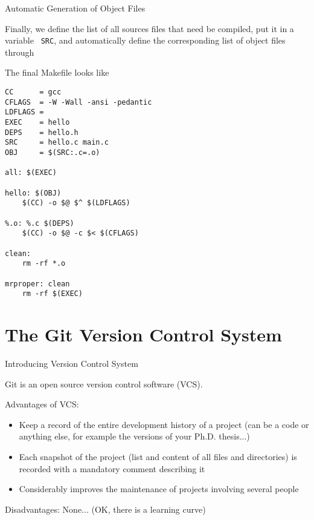 \documentclass[mode=present,paper=screen,size=12pt,style=paintings]{powerdot}
\newcommand{\boite}[1]{\fbox{\parbox{\textwidth}{{\tt\color{blue} #1}}}}
\newcommand{\cc}[1]{{\tt\color{blue} #1}}
\begin{document}
\begin{slide}{Automatic Generation of Object Files}

Finally, we define the list of all sources files that need be compiled, put it in a variable \cc{SRC}, and automatically define the corresponding list of object files through

\boite{OBJ= \$(SRC:.c=.o)}\medskip

The final Makefile looks like

\lstset{
    language=C,
    basicstyle=\tiny,
    frame=single
}
\begin{lstlisting}
CC      = gcc
CFLAGS  = -W -Wall -ansi -pedantic
LDFLAGS =
EXEC    = hello
DEPS    = hello.h
SRC     = hello.c main.c
OBJ     = $(SRC:.c=.o)

all: $(EXEC)

hello: $(OBJ)
	$(CC) -o $@ $^ $(LDFLAGS)

%.o: %.c $(DEPS)
	$(CC) -o $@ -c $< $(CFLAGS)

clean:
	rm -rf *.o

mrproper: clean
	rm -rf $(EXEC)
\end{lstlisting}

\end{slide}



\section{The Git Version Control System}


\begin{slide}{Introducing Version Control System}

Git is an open source version control software (VCS). \medskip

Advantages of VCS:
\begin{itemize}
\item Keep a record of the entire development history of a project (can be a code or anything else, for example the versions of your Ph.D. thesis...)
\item Each snapshot of the project (list and content of all files and directories) is recorded with a mandatory comment describing it
\item Considerably improves the maintenance of projects involving several people
\end{itemize}

Disadvantages: None... (OK, there is a learning curve)

\end{slide}
\end{document}
